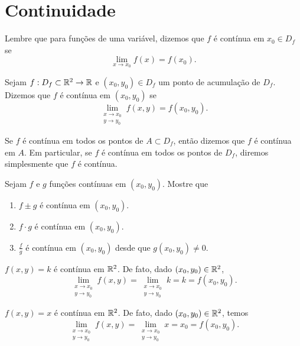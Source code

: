 \section{Continuidade}

Lembre que para funções de uma variável, dizemos que \(f\) é contínua em \(x_0\in D_f\) se \[\lim_{x\to x_0} f(x) = f(x_0).\]

\begin{definition}
    Sejam \(f: D_f\subset \mathbb{R}^2 \to \mathbb{R}\) e \((x_0,y_0)\in D_f\) um ponto de acumulação de \(D_f\). Dizemos que \(f\) é contínua  em \((x_0,y_0)\) se \[\displaystyle\lim_{\substack{x\to x_0 \\ y\to y_0}} f(x,y) = f(x_0,y_0). \]
\end{definition}

\begin{remark}
    Se \(f\) é contínua em todos os pontos de \(A\subset D_f\), então dizemos que \(f\) é contínua em \(A\). Em particular, se \(f\) é contínua em todos os pontos de \(D_f\), diremos simplesmente que \(f\) é contínua.
\end{remark}

\begin{exercise}
    Sejam \(f\) e \(g\) funções contínuas em \((x_0,y_0)\). Mostre que
        \begin{enumerate}
            \item \(f\pm g\) é contínua em \((x_0,y_0)\).
            \item \(f\cdot g\) é contínua em \((x_0,y_0)\).
            \item \(\frac{f}{g}\) é contínua em \((x_0,y_0)\) desde que \(g(x_0,y_0) \neq 0\).
        \end{enumerate}
\end{exercise}

\begin{example}
    \(f(x,y) = k\) é contínua em \(\mathbb{R}^2\). De fato, dado \((x_0,y_0)\in\mathbb{R}^2\), \[\displaystyle\lim_{\substack{x\to x_0 \\ y\to y_0}} f(x,y) = \displaystyle\lim_{\substack{x\to x_0 \\ y\to y_0}} k = k = f(x_0,y_0). \]
\end{example}

\begin{example}
    \(f(x,y) = x\) é contínua em \(\mathbb{R}^2\). De fato, dado \((x_0,y_0)\in\mathbb{R}^2\), temos \[\displaystyle\lim_{\substack{x\to x_0 \\ y\to y_0}} f(x,y) = \displaystyle\lim_{\substack{x\to x_0 \\ y\to y_0}} x = x_0 = f(x_0,y_0).\]
\end{example}

